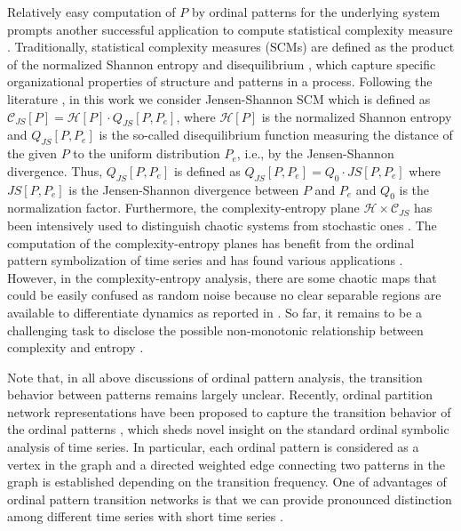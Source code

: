 \documentclass[12pt,aip,cha,reprint,nofootinbib]{revtex4-1}
\begin{document}
Relatively easy computation of $P$ by ordinal patterns for the underlying system prompts another successful application to compute statistical complexity measure \cite{kowalskiEntropy2011}. Traditionally, statistical complexity measures (SCMs) are defined as the product of the normalized Shannon entropy and disequilibrium \cite{kowalskiEntropy2011}, which capture specific organizational properties of structure and patterns in a process. Following the literature \cite{rossoPRL2007,LopezPLA1995,kowalskiEntropy2011}, in this work we consider Jensen-Shannon SCM which is defined as $\mathcal{C}_{JS}[P] = \mathcal{H}[P]  \cdot  Q_{JS}[P, P_e]$, where $\mathcal{H}[P]$ is the normalized Shannon entropy and $Q_{JS}[P, P_e]$ is the so-called disequilibrium function measuring the distance of the given $P$ to the uniform distribution $P_e$, i.e., by the Jensen-Shannon divergence. Thus, $Q_{JS}[P, P_e]$ is defined as $Q_{JS}[P, P_e] = Q_{0} \cdot JS[P, P_e]$ where $JS[P, P_e]$ is the Jensen-Shannon divergence between $P$ and $P_e$ and $Q_{0}$ is the normalization factor. Furthermore, the complexity-entropy plane $\mathcal{H} \times \mathcal{C}_{JS}$ has been intensively used to distinguish chaotic systems from stochastic ones \cite{rossoPRL2007}. The computation of the complexity-entropy planes has benefit from the ordinal pattern symbolization of time series and has found various applications \cite{rossoPRL2007,kowalskiEntropy2011}. However, in the complexity-entropy analysis, there are some chaotic maps that could be easily confused as random noise because no clear separable regions are available to differentiate dynamics as reported in \cite{BorgesAMC2019}. So far, it remains to be a challenging task to disclose the possible non-monotonic relationship between complexity and entropy \cite{MartinPLA2003}. 

Note that, in all above discussions of ordinal pattern analysis, the transition behavior between patterns remains largely unclear. Recently, ordinal partition network representations have been proposed to capture the transition behavior of the ordinal patterns \cite{MichaelChaos2015,KulpChaos2016,zhangSciRep2017,McCullough2017b,BorgesAMC2019}, which sheds novel insight on the standard ordinal symbolic analysis of time series. In particular, each ordinal pattern is considered as a vertex in the graph and a directed weighted edge connecting two patterns in the graph is established depending on the transition frequency. One of advantages of ordinal pattern transition networks is that we can provide pronounced distinction among different time series with short time series \cite{MichaelChaos2015,BorgesAMC2019}. 
\end{document}

